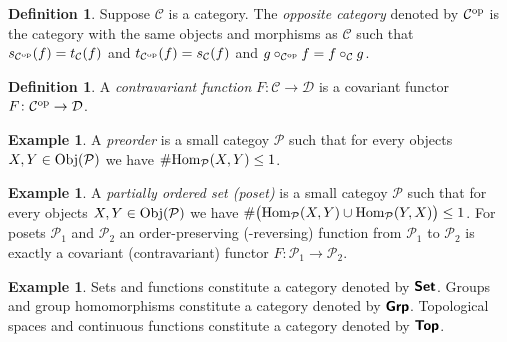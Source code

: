 \documentclass[12pt]{article}
\theoremstyle{definition}
\newtheorem{dfn}[thm]{Definition}
\newtheorem{exm}[thm]{Example}
\newcommand{\CC}{\mathcal{C}}
\newcommand{\DD}{\mathcal{D}}
\newcommand{\PP}{\mathcal{P}}
\newcommand{\catname}[1]{\textup{\sffamily\textbf{#1}}}
\newcommand*{\Set}{\catname{Set}}
\newcommand*{\Grp}{\catname{Grp}}
\newcommand*{\Top}{\catname{Top}}
\newcommand{\Obj}[1]{\textup{Obj}(#1)}
\begin{document}
\begin{dfn}
    Suppose $\CC$ is a category. The \emph{opposite category} denoted by $\CC^{\textup{op}}$ is the category with the same objects and morphisms as $\CC$ such that $s_{\CC^{\textup{op}}}(f)=t_{\CC}(f)$ and $t_{\CC^{\textup{op}}}(f)=s_{\CC}(f)$ and $g\circ_{\CC^\textup{op}} f=f\circ_\CC g$.
\end{dfn}

\begin{dfn}
    A \emph{contravariant function} $F\colon\CC\to\DD$ is a covariant functor $F\colon\CC^\textup{op}\to\DD$.
\end{dfn}

\begin{exm}
    A \emph{preorder} is a small categoy $\PP$ such that for every objects $X,Y\in\Obj{\PP}$ we have $\#\textup{Hom}_\PP(X,Y)\leq1$.
\end{exm}

\begin{exm}
    A \emph{partially ordered set (poset)} is a small categoy $\PP$ such that for every objects $X,Y\in\Obj{\PP}$ we have $\#\big(\textup{Hom}_\PP(X,Y)\cup\textup{Hom}_\PP(Y,X)\big)\leq\nolinebreak1$. For posets $\PP_1$ and $\PP_2$ an order-preserving (-reversing) function from $\PP_1$ to $\PP_2$ is exactly a covariant (contravariant) functor $F\colon\PP_1\to\PP_2$.
\end{exm}

\begin{exm}
    Sets and functions constitute a category denoted by $\Set$. Groups and group homomorphisms constitute a category denoted by $\Grp$. Topological spaces and continuous functions constitute a category denoted by $\Top$.
\end{exm}
\end{document}
